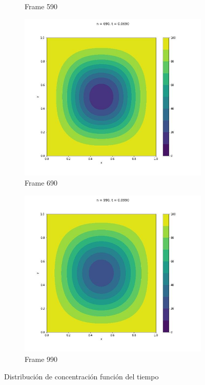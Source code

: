 \documentclass{article}
\begin{document}
\begin{figure} [H]
\begin{subfigure}{0.25\linewidth}
    \caption{Frame 590}
  \end{subfigure}
      \begin{subfigure}{0.25\linewidth}
    \centering
    \includegraphics[width=\linewidth]{Cuadrada/2D/690.jpg}
    \caption{Frame 690}
  \end{subfigure}
      \begin{subfigure}{0.25\linewidth}
    \centering
    \includegraphics[width=\linewidth]{Cuadrada/2D/990.jpg}
    \caption{Frame 990}
  \end{subfigure}
  \caption{Distribución de concentración función del tiempo}
  \label{fig:cuadrada2d}
\end{figure}
\end{document}
